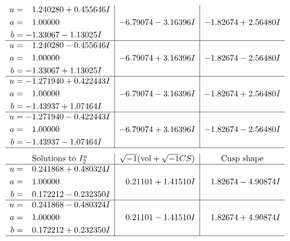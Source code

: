 \documentclass[1p]{elsarticle_modified}
\theoremstyle{definition}
\newcommand{\I}{\sqrt{-1}}
\begin{document}
$$\begin{array}{c|c|c}
\begin{aligned}
u &= \phantom{-}1.240280 + 0.455646 I \\
a &= \phantom{-}1.00000\phantom{ +0.000000I} \\
b &= -1.33067 - 1.13025 I\end{aligned}
 & -6.79074 - 3.16396 I & -1.82674 + 2.56480 I \\ \hline\begin{aligned}
u &= \phantom{-}1.240280 - 0.455646 I \\
a &= \phantom{-}1.00000\phantom{ +0.000000I} \\
b &= -1.33067 + 1.13025 I\end{aligned}
 & -6.79074 + 3.16396 I & -1.82674 - 2.56480 I \\ \hline\begin{aligned}
u &= -1.271940 + 0.422443 I \\
a &= \phantom{-}1.00000\phantom{ +0.000000I} \\
b &= -1.43937 + 1.07464 I\end{aligned}
 & -6.79074 - 3.16396 I & -1.82674 + 2.56480 I \\ \hline\begin{aligned}
u &= -1.271940 - 0.422443 I \\
a &= \phantom{-}1.00000\phantom{ +0.000000I} \\
b &= -1.43937 - 1.07464 I\end{aligned}
 & -6.79074 + 3.16396 I & -1.82674 - 2.56480 I\\
 \hline 
 \end{array}$$\newpage$$\begin{array}{c|c|c}  
\text{Solutions to }I^u_{2}& \I (\text{vol} + \sqrt{-1}CS) & \text{Cusp shape}\\
 \hline 
\begin{aligned}
u &= \phantom{-}0.241868 + 0.480324 I \\
a &= \phantom{-}1.00000\phantom{ +0.000000I} \\
b &= \phantom{-}0.172212 - 0.232350 I\end{aligned}
 & \phantom{-}0.21101 + 1.41510 I & \phantom{-}1.82674 - 4.90874 I \\ \hline\begin{aligned}
u &= \phantom{-}0.241868 - 0.480324 I \\
a &= \phantom{-}1.00000\phantom{ +0.000000I} \\
b &= \phantom{-}0.172212 + 0.232350 I\end{aligned}
 & \phantom{-}0.21101 - 1.41510 I & \phantom{-}1.82674 + 4.90874 I\\
 \hline 
 \end{array}$$\newpage\newpage\renewcommand{\arraystretch}{1}
\end{document}
